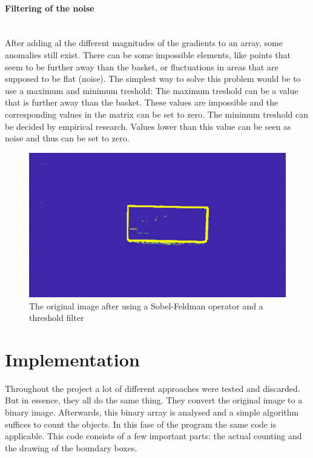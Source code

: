 \documentclass[11pt]{article}
\begin{document}
\paragraph{Filtering of the noise}\mbox{}\\
After adding al the different magnitudes of the gradients to an array, some anomalies still exist. There can be some impossible elements, like points that seem to be further away than the basket, or fluctuations in areas that are supposed to be flat (noise). The simplest way to solve this problem would be to use a maximum and minimum treshold: The maximum treshold can be a value that is further away than the basket. These values are impossible and the corresponding values in the matrix can be set to zero. The minimum treshold can be decided by empirical research. Values lower than this value can be seen as noise and thus can be set to zero.

\begin{figure}[h]
	\center
  \includegraphics[width=0.6\linewidth]{sobel_and_threshold.png}
  \caption{The original image after using a Sobel-Feldman operator and a threshold filter}
  \label{fig:Moore_Neighbor}
\end{figure}

\section{Implementation}

\noindent Throughout the project a lot of different approaches were tested and discarded. But in essence, they all do the same thing. They convert the original image to a binary image. Afterwards, this binary array is analysed and a simple algorithm suffices to count the objects. In this fase of the program the same code is applicable. This code consists of a few important parts: the actual counting and the drawing of the boundary boxes. 
\end{document}
